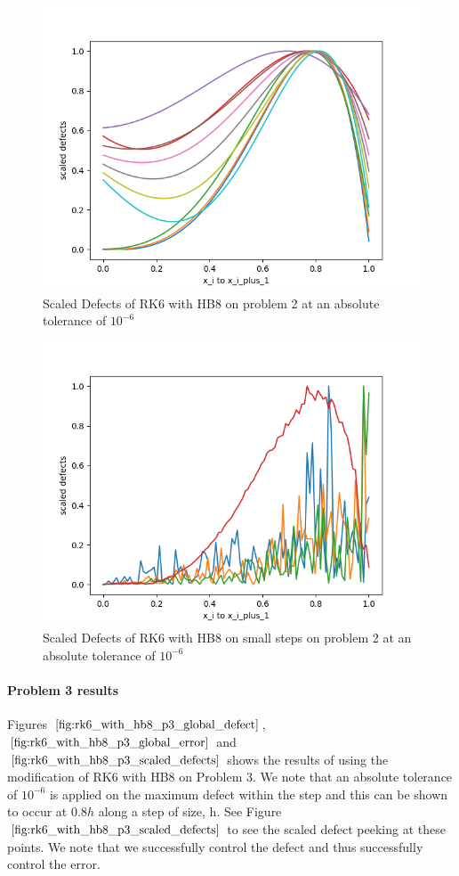 \documentclass{article}
\begin{document}
\begin{figure}[H]
\centering
\includegraphics[width=0.7\linewidth]{./figures/rk6_with_hb8_p2_scaled_defects}
\caption{Scaled Defects of RK6 with HB8 on problem 2 at an absolute tolerance of $10^{-6}$}
\label{fig:rk6_with_hb8_p2_scaled_defects}
\end{figure}

\begin{figure}[H]
\centering
\includegraphics[width=0.7\linewidth]{./figures/rk6_with_hb8_p2_scaled_defects_small_steps}
\caption{Scaled Defects of RK6 with HB8 on small steps on problem 2 at an absolute tolerance of $10^{-6}$}
\label{fig:rk6_with_hb8_p2_scaled_defects_small_steps}
\end{figure}

\paragraph{Problem 3 results}
Figures $\ref{fig:rk6_with_hb8_p3_global_defect}$, $\ref{fig:rk6_with_hb8_p3_global_error}$ and $\ref{fig:rk6_with_hb8_p3_scaled_defects}$ shows the results of using the modification of RK6 with HB8 on Problem 3. 
We note that an absolute tolerance of $10^{-6}$ is applied on the maximum defect within the step and this can be shown to occur at $0.8h$ along a step of size, h. See Figure $\ref{fig:rk6_with_hb8_p3_scaled_defects}$ to see the scaled defect peeking at these points. We note that we successfully control the defect and thus successfully control the error.
\end{document}
